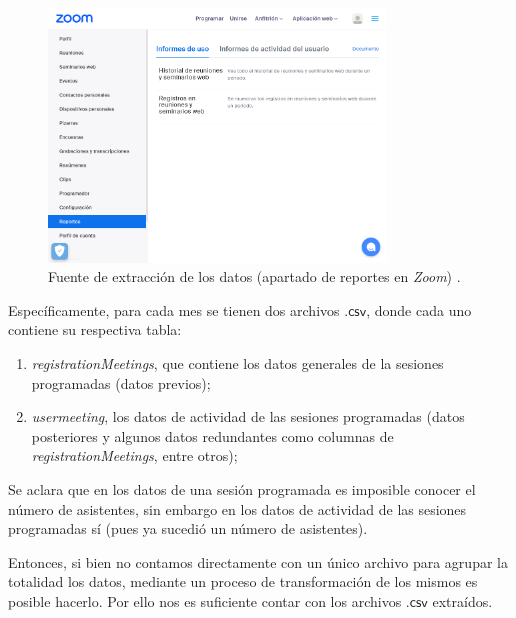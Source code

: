 \documentclass[11pt,a4paper]{book}
\theoremstyle{definition}%
\begin{document}
                \begin{figure}[H]
                    \centering
                    \includegraphics[width=0.8\textwidth]{Sources/zoomReport.png}
                    \caption{Fuente de extracción de los datos (apartado de reportes en \textit{Zoom}) \cite{zoom:reports}.}
                    \label{fig:zoomReport}
                \end{figure}

                Específicamente, para cada mes se tienen dos archivos $\mathsf{.csv}$, donde cada uno contiene su respectiva tabla:
                \begin{enumerate}\label{raw tables dict}
                    \item \textit{registrationMeetings}, que contiene los datos generales de la sesiones programadas (datos previos);
                    \item \textit{usermeeting}, los datos de actividad de las sesiones programadas (datos posteriores y algunos datos redundantes como columnas de \textit{registrationMeetings}, entre otros);
                \end{enumerate}
                
                Se aclara que en los datos de una sesión programada es imposible conocer el número de asistentes, sin embargo en los datos de actividad de las sesiones programadas sí (pues ya sucedió un número de asistentes).
    
                Entonces, si bien no contamos directamente con un único archivo para agrupar la totalidad los datos, mediante un proceso de transformación de los mismos es posible hacerlo. Por ello nos es suficiente contar con los archivos $\mathsf{.csv}$ extraídos.
                
\end{document}
